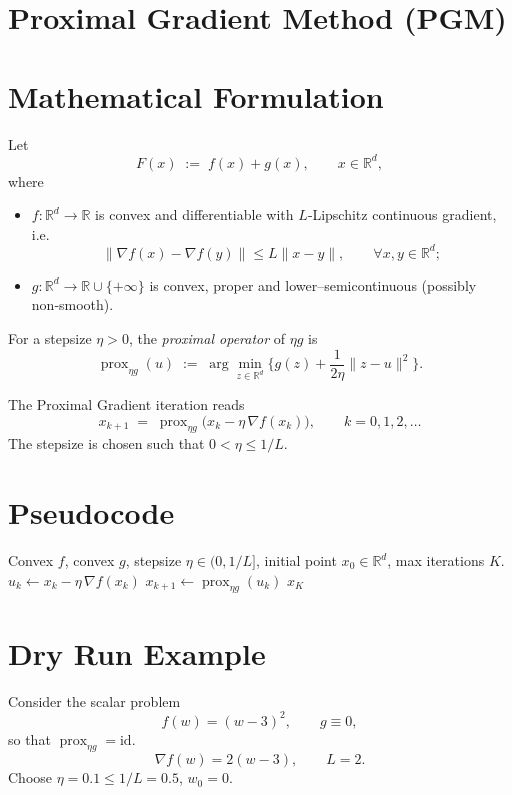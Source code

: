 \documentclass{article}
\newcommand{\prox}{\operatorname{prox}}
\newcommand{\grad}{\nabla}
\newcommand{\R}{\mathbb{R}}
\begin{document}
\section*{Proximal Gradient Method (PGM)}

\section*{Mathematical Formulation}
Let  
\[
F(x)\;:=\;f(x)+g(x),\qquad x\in\R^{d},
\]
where  

\begin{itemize}[noitemsep]
\item $f:\R^{d}\!\to\!\R$ is convex and differentiable with $L$‑Lipschitz continuous gradient, i.e.
\[
\|\grad f(x)-\grad f(y)\|\le L\|x-y\|,\qquad\forall x,y\in\R^{d};
\]
\item $g:\R^{d}\!\to\!\R\cup\{+\infty\}$ is convex, proper and lower–semicontinuous (possibly non‑smooth).
\end{itemize}
For a stepsize $\eta>0$, the \emph{proximal operator} of $\eta g$ is
\[
\prox_{\eta g}(u)\;:=\;\arg\min_{z\in\R^{d}}\Big\{ g(z)+\frac{1}{2\eta}\|z-u\|^{2}\Big\}.
\]

The Proximal Gradient iteration reads
\begin{equation}
\boxed{\;
x_{k+1}\;=\;\prox_{\eta g}\bigl(x_{k}-\eta\,\grad f(x_{k})\bigr),\qquad k=0,1,2,\dots
\;}
\label{eq:pgm}
\end{equation}
The stepsize is chosen such that $0<\eta\le 1/L$.

\section*{Pseudocode}
\begin{algorithm}[H]
\caption{Proximal Gradient Method}
\begin{algorithmic}[1]
\Require Convex $f$, convex $g$, stepsize $\eta\in(0,1/L]$, initial point $x_{0}\in\R^{d}$, max iterations $K$.
    \State $u_{k}\gets x_{k}-\eta\,\grad f(x_{k})$ \hfill{}
    \State $x_{k+1}\gets \prox_{\eta g}(u_{k})$ \hfill{}
\EndFor
\State \Return $x_{K}$
\end{algorithmic}
\end{algorithm}

\section*{Dry Run Example}
Consider the scalar problem  
\[
f(w)=(w-3)^{2},\qquad g\equiv0,
\]
so that $\prox_{\eta g}= \text{id}$.
\[
\grad f(w)=2(w-3),\qquad L=2.
\]
Choose $\eta=0.1\le 1/L=0.5$, $w_{0}=0$.
\end{document}
